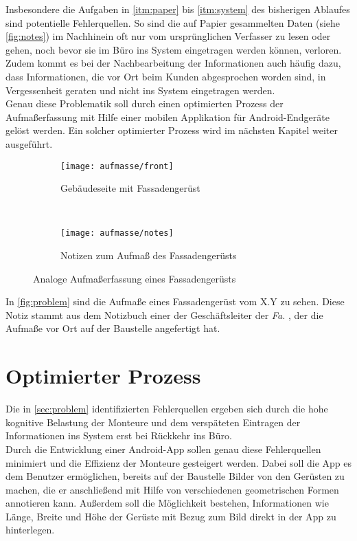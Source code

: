 Insbesondere die Aufgaben in \autoref{itm:paper} bis \autoref{itm:system} des bisherigen Ablaufes sind potentielle Fehlerquellen.
So sind die auf Papier gesammelten Daten (siehe \autoref{fig:notes}) im Nachhinein oft nur vom ursprünglichen Verfasser zu lesen oder gehen, noch bevor sie im Büro ins System eingetragen werden können, verloren.
Zudem kommt es bei der Nachbearbeitung der Informationen auch häufig dazu, dass Informationen, die vor Ort beim Kunden abgesprochen worden sind, in Vergessenheit geraten und nicht ins System eingetragen werden. \\

Genau diese Problematik soll durch einen optimierten Prozess der Aufmaßerfassung mit Hilfe einer mobilen Applikation für Android-Endgeräte gelöst werden.
Ein solcher optimierter Prozess wird im nächsten Kapitel weiter ausgeführt.

\begin{figure}[h]
  \begin{subfigure}[t]{0.4\textwidth}
    \centering
    \texttt{[image: aufmasse/front]}
    \caption{Gebäudeseite mit Fassadengerüst}
  \end{subfigure}
  ~
  \begin{subfigure}[t]{0.4\textwidth}
    \centering
    \texttt{[image: aufmasse/notes]}
    \caption{Notizen zum Aufmaß des Fassadengerüsts}
    \label{fig:notes}
  \end{subfigure}
  \centering
  \caption{Analoge Aufmaßerfassung eines Fassadengerüsts}
  \label{fig:problem}
\end{figure}

In \autoref{fig:problem} sind die Aufmaße eines Fassadengerüst vom X.Y zu sehen.
Diese Notiz stammt aus dem Notizbuch einer der Geschäftsleiter der \emph{Fa.} \vr{}, der die Aufmaße vor Ort auf der Baustelle angefertigt hat.

\section{Optimierter Prozess}
Die in \autoref{sec:problem} identifizierten Fehlerquellen ergeben sich durch die hohe kognitive Belastung der Monteure und dem verspäteten Eintragen der Informationen ins System erst bei Rückkehr ins Büro. \\

Durch die Entwicklung einer Android-App sollen genau diese Fehlerquellen minimiert und die Effizienz der Monteure gesteigert werden.
Dabei soll die App es dem Benutzer ermöglichen, bereits auf der Baustelle Bilder von den Gerüsten zu machen, die er anschließend mit Hilfe von verschiedenen geometrischen Formen annotieren kann.
Außerdem soll die Möglichkeit bestehen, Informationen wie Länge, Breite und Höhe der Gerüste mit Bezug zum Bild direkt in der App zu hinterlegen. \\

